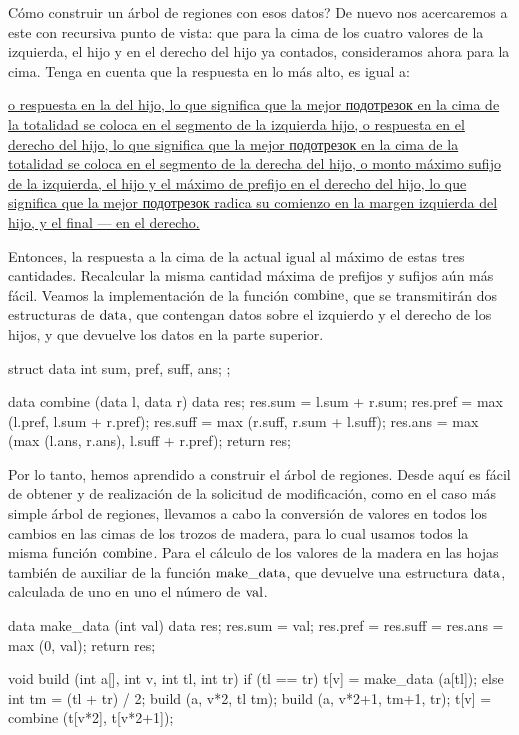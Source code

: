 Cómo construir un árbol de regiones con esos datos? De nuevo nos acercaremos a este con recursiva punto de vista: que para la cima de los cuatro valores de la izquierda, el hijo y en el derecho del hijo ya contados, consideramos ahora para la cima. Tenga en cuenta que la respuesta en lo más alto, es igual a:

\ul{
\li o respuesta en la del hijo, lo que significa que la mejor подотрезок en la cima de la totalidad se coloca en el segmento de la izquierda hijo,
\li o respuesta en el derecho del hijo, lo que significa que la mejor подотрезок en la cima de la totalidad se coloca en el segmento de la derecha del hijo,
\li o monto máximo sufijo de la izquierda, el hijo y el máximo de prefijo en el derecho del hijo, lo que significa que la mejor подотрезок radica su comienzo en la margen izquierda del hijo, y el final --- en el derecho.
}

Entonces, la respuesta a la cima de la actual igual al máximo de estas tres cantidades. Recalcular la misma cantidad máxima de prefijos y sufijos aún más fácil. Veamos la implementación de la función $\rm combine$, que se transmitirán dos estructuras de $\rm data$, que contengan datos sobre el izquierdo y el derecho de los hijos, y que devuelve los datos en la parte superior.

\code
struct data {
int sum, pref, suff, ans;
};

data combine (data l, data r) {
data res;
res.sum = l.sum + r.sum;
res.pref = max (l.pref, l.sum + r.pref);
res.suff = max (r.suff, r.sum + l.suff);
res.ans = max (max (l.ans, r.ans), l.suff + r.pref);
return res;
}
\endcode

Por lo tanto, hemos aprendido a construir el árbol de regiones. Desde aquí es fácil de obtener y de realización de la solicitud de modificación, como en el caso más simple árbol de regiones, llevamos a cabo la conversión de valores en todos los cambios en las cimas de los trozos de madera, para lo cual usamos todos la misma función $\rm combine$. Para el cálculo de los valores de la madera en las hojas también de auxiliar de la función $\rm make\_data$, que devuelve una estructura $\rm data$, calculada de uno en uno el número de $\rm val$.

\code
data make_data (int val) {
data res;
res.sum = val;
res.pref = res.suff = res.ans = max (0, val);
return res;
}

void build (int a[], int v, int tl, int tr) {
if (tl == tr)
t[v] = make_data (a[tl]);
else {
int tm = (tl + tr) / 2;
build (a, v*2, tl tm);
build (a, v*2+1, tm+1, tr);
t[v] = combine (t[v*2], t[v*2+1]);
}
}

